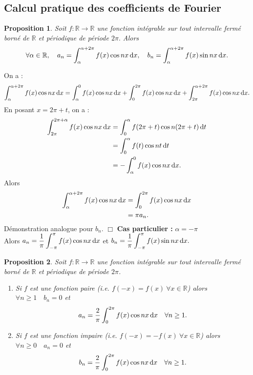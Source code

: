\documentclass[11pt, a4paper]{book}
\newtheorem{pro}{Proposition}[section]
\newenvironment{pr}{\noindent {\bf Preuve} \noindent} {\hfill $\Box$\vskip 5mm}
\begin{document}
\subsection{Calcul pratique des coefficients de Fourier}
\begin{pro} \label{pro7.2.1} Soit $f:\mathbb{R}\rightarrow\mathbb{R}$ une fonction int\'egrable sur tout intervalle ferm\'e born\'e de $\mathbb{R}$ et p\'eriodique de p\'eriode $2\pi.$ Alors $$\forall \alpha\in \mathbb{R}, \quad a_n=\int_\alpha^{\alpha+2\pi}f(x)\cos nx\,\mathrm{d} x,\quad b_n=\int_\alpha^{\alpha+2\pi}f(x)\sin nx\,\mathrm{d} x.$$
\end{pro}
\begin{pr}\quad
On a : $$\int_\alpha^{\alpha+2\pi}f(x)\cos nx\,\mathrm{d} x=\int_\alpha^0f(x)\cos nx\,\mathrm{d} x+\int_0^{2\pi}f(x)\cos nx\,\mathrm{d} x+\int_{2\pi}^{\alpha+2\pi}f(x)\cos nx\,\mathrm{d} x.$$
En posant $x=2\pi+t$, on a :
\begin{align*}
\int_{2\pi}^{2\pi+\alpha}f(x)\cos nx\,\mathrm{d} x&=\int_0^\alpha f(2\pi+t)\cos n(2\pi+t)\,\mathrm{d} t\\&=\int_0^\alpha f(t)\cos nt\,\mathrm{d} t\\&=-\int_\alpha^0f(x)\cos nx\,\mathrm{d} x.
\end{align*} Alors 
\begin{align*}
\int_\alpha^{\alpha+2\pi}f(x)\cos nx\,\mathrm{d} x&=\int_0^{2\pi}f(x)\cos nx\,\mathrm{d} x\\&=\pi a_n.
\end{align*} D\'emonstration analogue pour $b_n$.
\end{pr}
\textbf{Cas particulier :} $\alpha=-\pi$ \\
Alors ${\displaystyle a_n=\dfrac{1}{\pi}\int_{-\pi}^{\pi}f(x)\cos nx\,\mathrm{d} x}$ et ${\displaystyle b_n=\dfrac{1}{\pi}\int_{-\pi}^{\pi}f(x)\sin nx\,\mathrm{d} x.}$
\begin{pro}\label{pro7.2.2} Soit $f:\mathbb{R}\rightarrow\mathbb{R}$ une fonction int\'egrable sur tout intervalle ferm\'e born\'e de $\mathbb{R}$ et p\'eriodique de p\'eriode $2\pi$. 
\begin{enumerate}
\item Si $f$ est une fonction paire (i.e. $f(-x)=f(x)~\forall x\in \mathbb{R}$) alors $\forall n\geq 1\quad b_n=0$ et $$a_n=\dfrac{2}{\pi}\int_0^{2\pi}f(x)\cos nx\,\mathrm{d} x\quad\forall n\geq1.$$
\item Si $f$ est une fonction impaire (i.e. $f(-x)=-f(x)~\forall x\in \mathbb{R}$) alors $\forall n\geq0\quad a_n=0$ et $$b_n=\dfrac{2}{\pi}\int_0^{2\pi}f(x)\cos nx\,\mathrm{d} x \quad \forall n\geq1.$$
\end{enumerate}
\end{pro}
\end{document}

